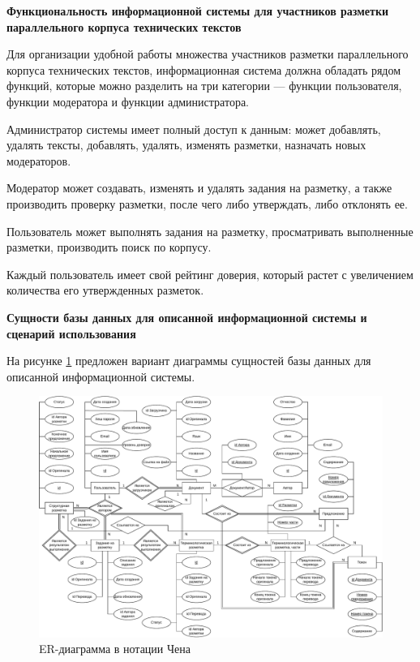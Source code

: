 \documentclass[a4paper,oneside,14pt]{article}
\begin{document}

\textbf{Функциональность информационной системы для участников разметки параллельного корпуса технических текстов}

Для организации удобной работы множества участников разметки параллельного корпуса технических текстов, информационная система должна обладать рядом функций, которые можно разделить на три категории --- функции пользователя, функции модератора и функции администратора.

Администратор системы имеет полный доступ к данным: может добавлять, удалять тексты, добавлять, удалять, изменять разметки, назначать новых модераторов.

Модератор может создавать, изменять и удалять задания на разметку, а также производить проверку разметки, после чего либо утверждать, либо отклонять ее.

Пользователь может выполнять задания на разметку, просматривать выполненные разметки, производить поиск по корпусу.

Каждый пользователь имеет свой рейтинг доверия, который растет с увеличением количества его утвержденных разметок.

\textbf{Сущности базы данных для описанной информационной системы и сценарий использования}

На рисунке \ref{fig:chen} предложен вариант диаграммы сущностей базы данных для описанной информационной системы.

\begin{figure}[H]
	\centering
	\includegraphics[width=\textwidth]{diag/chen.pdf}
	\caption{ER-диаграмма в нотации Чена}
	\label{fig:chen}
\end{figure}
\end{document}
